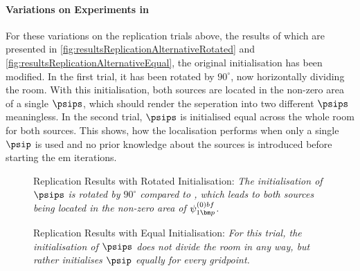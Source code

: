 \paragraph{Variations on Experiments in \citeauthor{Schwartz2014} \citeyearpar{Schwartz2014}}
For these variations on the replication trials above, the results of which are presented in \autoref{fig:resultsReplicationAlternativeRotated} and \autoref{fig:resultsReplicationAlternativeEqual}, the original initialisation has been modified. In the first trial, it has been rotated by $90^{\circ}$, now horizontally dividing the room. With this initialisation, both sources are located in the non-zero area of a single $\psips$, which should render the seperation into two different $\psips$ meaningless. In the second trial, 
$\psips$ is initialised equal across the whole room for both sources. This shows, how the localisation performs when only a single $\psip$ is used and no prior knowledge about the sources is introduced before starting the \gls{em} iterations.

\begin{figure}[!htbp]
\centering
    \iftoggle{quick}{%
		\texttt{[image: plots/schwartz2014-variation/s=2-sloc=schwartz2014-T60=0.7-prior=schwartz2014-unlucky-results]}
		}{%
			\setlength{\figurewidth}{\textwidth}
    
		}
	\caption[Replication Results with Rotated Initialisation]{Replication Results with Rotated Initialisation: \itshape The initialisation of $\psips$ is rotated by $90^{\circ}$ compared to \cite{Schwartz2014}, which leads to both sources being located in the non-zero area of $\psi_{1\bm p}^{\text(0)bf}$.}
	\label{fig:resultsReplicationAlternativeRotated}
\end{figure}

\begin{figure}[!htbp]
\centering
    \iftoggle{quick}{%
		\texttt{[image: plots/schwartz2014-variation/s=2-sloc=schwartz2014-T60=0.7-prior=equal-results]}
		}{%
			\setlength{\figurewidth}{\textwidth}
    
		}
	\caption[Replication Results with Equal Initialisation]{Replication Results with Equal Initialisation: \itshape For this trial, the initialisation of $\psips$ does not divide the room in any way, but rather initialises $\psip$ equally for every gridpoint.}
	\label{fig:resultsReplicationAlternativeEqual}
\end{figure}

